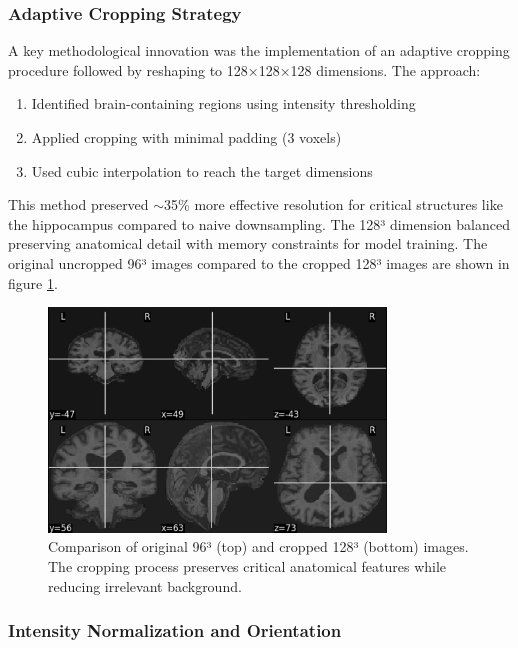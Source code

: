 \documentclass[12pt, a4paper]{article}
\begin{document}
\subsubsection{Adaptive Cropping Strategy}

A key methodological innovation was the implementation of an adaptive cropping procedure followed by reshaping to 128×128×128 dimensions. The approach:

\begin{enumerate}
    \item Identified brain-containing regions using intensity thresholding
    \item Applied cropping with minimal padding (3 voxels)
    \item Used cubic interpolation to reach the target dimensions
\end{enumerate}

This method preserved $\sim$35\% more effective resolution for critical structures like the hippocampus compared to naive downsampling. The 128³ dimension balanced preserving anatomical detail with memory constraints for model training. The original uncropped 96³ images compared to the cropped 128³ images are shown in figure \ref{fig:cropping}.
\begin{figure}[htbp]
  \centering
  \includegraphics[width=0.8\textwidth]{figures/cropping.png}
  \caption{Comparison of original 96³ (top) and cropped 128³ (bottom) images. The cropping process preserves critical anatomical features while reducing irrelevant background.}
  \label{fig:cropping}
\end{figure}

\subsubsection{Intensity Normalization and Orientation}
\end{document}
